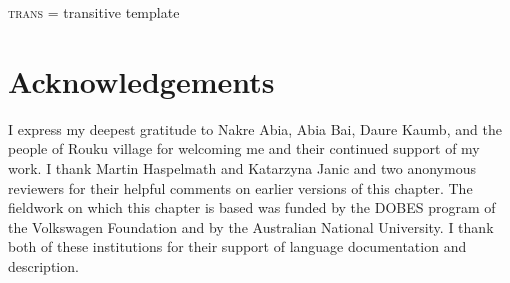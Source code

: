 \documentclass[output=paper]{langscibook}
\begin{document}
		\textsc{trans} = {transitive template}\\


\section*{Acknowledgements}
I express my deepest gratitude to Nakre Abia, Abia Bai, Daure Kaumb, and the people of Rouku village for welcoming me and their continued support of my work. I thank Martin Haspelmath and Katarzyna Janic and two anonymous reviewers for their helpful comments on earlier versions of this chapter. The fieldwork on which this chapter is based was funded by the DOBES program of the Volkswagen Foundation and by the Australian National University. I thank both of these institutions for their support of language documentation and description.

{\sloppy\printbibliography[heading=subbibliography,notkeyword=this]}
\end{document}
